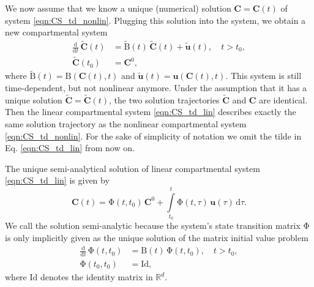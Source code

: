 \documentclass[11pt,a4paper]{article}
\renewcommand{\vec}[1]{\mathbf{#1}}
\newcommand{\tens}[1]{\mathrm{#1}}
\newcommand{\id}{\tens{Id}}
\newcommand{\deriv}[1]{\frac{\mathrm{d}}{\mathrm{d}#1}}
\newcommand{\dd}[1]{\,\mathrm{d}#1}
\newcommand{\intl}{\int\limits}
\newcommand{\R}{\mathbb{R}}
\begin{document}
    We now assume that we know a unique (numerical) solution $\vec{C}=\vec{C}(t)$ of system \eqref{eqn:CS_td_nonlin}.
    Plugging this solution into the system, we obtain a new compartmental system
    \begin{equation}\label{eqn:CS_td_lin}
        \begin{aligned}
            \deriv{t}\,\widetilde{\vec{C}}(t) &= \widetilde{\tens{B}}(t)\,\widetilde{\vec{C}}(t) + \widetilde{\vec{u}}(t),\quad t>t_0,\\
            \widetilde{\vec{C}}(t_0) &= \vec{C}^0,
        \end{aligned}
    \end{equation}
    where $\widetilde{\tens{B}}(t)=\tens{B}(\vec{C}(t),t)$ and $\widetilde{\vec{u}}(t)=\vec{u}(\vec{C}(t),t)$.
    This system is still time-dependent, but not nonlinear anymore.
    Under the assumption that it has a unique solution $\widetilde{\vec{C}}=\widetilde{\vec{C}}(t)$, the two solution trajectories $\widetilde{\vec{C}}$ and $\vec{C}$ are identical.
    Then the linear compartmental system \eqref{eqn:CS_td_lin} describes exactly the same solution trajectory as the nonlinear compartmental system \eqref{eqn:CS_td_nonlin}.
    For the sake of simplicity of notation we omit the tilde in Eq. \eqref{eqn:CS_td_lin} from now on.
    
    The unique semi-analytical solution of linear compartmental system \eqref{eqn:CS_td_lin} is given by \citep{Brockett2015}
    \begin{equation*}
        \vec{C}(t) = \tens{\Phi}(t,t_0)\,\vec{C}^0 + \intl_{t_0}^t \tens{\Phi}(t,\tau)\,\vec{u}(\tau)\dd{\tau}.
    \end{equation*}
    We call the solution semi-analytic because the system's state transition matrix $\tens{\Phi}$ is only implicitly given as the unique solution of the matrix initial value problem
    \begin{equation*}
        \begin{aligned}
            \deriv{t}\,\tens{\Phi}(t,t_0) &= \tens{B}(t)\,\tens{\Phi}(t,t_0),\quad t>t_0,\\
            \tens{\Phi}(t_0,t_0) &= \id,
        \end{aligned}
    \end{equation*}
    where $\id$ denotes the identity matrix in $\R^d$. 
\end{document}
